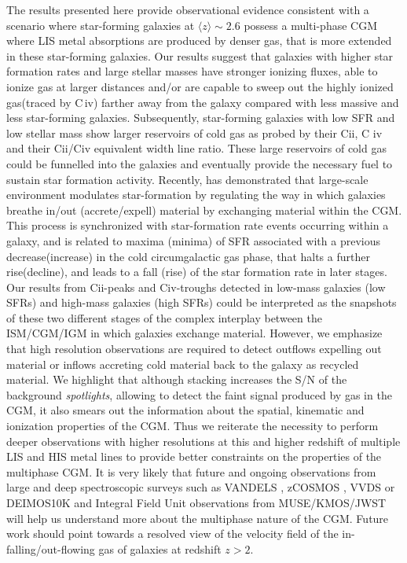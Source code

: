 \documentclass[longauth]{aa}
\begin{document}
The results presented here provide observational evidence consistent with a
scenario where star-forming galaxies at $\langle z \rangle \sim 2.6$ possess
a multi-phase CGM where LIS metal absorptions are produced by denser gas,
that is more extended in these star-forming galaxies. Our results suggest
that galaxies with higher star formation rates and large stellar masses have
stronger ionizing fluxes, able to ionize gas at larger distances and/or are
capable to sweep out the highly ionized gas(traced by C\,{\sc iv}) farther
away from the galaxy compared with less massive and less star-forming
galaxies. Subsequently, star-forming galaxies with low SFR and low stellar
mass show larger reservoirs of cold gas as probed by their C{\sc ii}, C
{\sc iv} and their C{\sc ii}/C{\sc iv} equivalent width line ratio. These
large reservoirs of cold gas could be funnelled into the galaxies and
eventually provide the necessary fuel to sustain star formation activity.
Recently, \cite{WangS22} has demonstrated that large-scale environment
modulates star-formation by regulating the way in which galaxies breathe
in/out (accrete/expell) material by exchanging material within the CGM. This
process is synchronized with star-formation rate events occurring within a
galaxy, and is related to maxima (minima) of SFR associated with a previous
decrease(increase) in the cold circumgalactic gas phase, that halts a further
rise(decline), and leads to a fall (rise) of the star formation rate in later
stages. Our results from C{\sc ii}-peaks and C{\sc iv}-troughs detected in
low-mass galaxies (low SFRs) and high-mass galaxies (high SFRs) could be
interpreted as the snapshots of these two different stages of the complex
interplay between the ISM/CGM/IGM in which galaxies exchange material.
However, we emphasize that high resolution observations are required to
detect outflows expelling out material or inflows accreting
cold material back to the galaxy as recycled material. We highlight that
although stacking increases the S/N of the background \textit
{spotlights}, allowing to detect the faint signal produced by gas in the CGM,
it also smears out the information about the spatial, kinematic and
ionization properties of the CGM. Thus we reiterate the necessity to perform
deeper observations with higher resolutions at this and higher redshift of
multiple LIS and HIS metal lines to provide better constraints on the
properties of the multiphase CGM. It is very likely that future and ongoing observations
from large and deep spectroscopic surveys such as VANDELS \citep
{McLure18,Pentericci18}, zCOSMOS \citep{Lilly07,Lilly09}, VVDS\citep
{LeFevre13b} or DEIMOS10K \citep{Hasinger18} and Integral Field Unit
observations from MUSE/KMOS/JWST will help us understand more about the
multiphase nature of the CGM. Future work should point towards a resolved
view of the velocity field of the in-falling/out-flowing gas of galaxies at
redshift $z > 2$.
\end{document}
